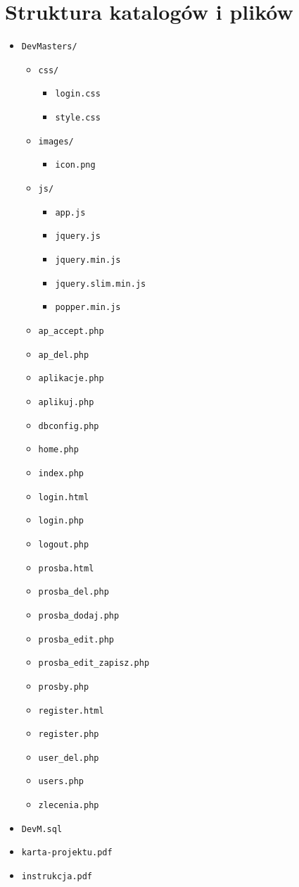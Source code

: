 \documentclass[a4paper,12pt]{article}
\begin{document}
\section{Struktura katalogów i plików}
\begin{itemize}
  \item \texttt{DevMasters/}
  \begin{itemize}
  \item \texttt{css/}
  \begin{itemize}
      \item \texttt{login.css}
      \item \texttt{style.css}
    \end{itemize}
    \item \texttt{images/}
    \begin{itemize}
      \item \texttt{icon.png}
    \end{itemize}
    \item \texttt{js/}
    \begin{itemize}
      \item \texttt{app.js}
      \item \texttt{jquery.js}
      \item \texttt{jquery.min.js}
      \item \texttt{jquery.slim.min.js}
      \item \texttt{popper.min.js}
    \end{itemize}
    \item \texttt{ap\_accept.php}
    \item \texttt{ap\_del.php}
    \item \texttt{aplikacje.php}
    \item \texttt{aplikuj.php}
    \item \texttt{dbconfig.php}
    \item \texttt{home.php}
    \item \texttt{index.php}
    \item \texttt{login.html}
    \item \texttt{login.php}
    \item \texttt{logout.php}
    \item \texttt{prosba.html}
    \item \texttt{prosba\_del.php}
    \item \texttt{prosba\_dodaj.php}
    \item \texttt{prosba\_edit.php}
    \item \texttt{prosba\_edit\_zapisz.php}
    \item \texttt{prosby.php}
    \item \texttt{register.html}
    \item \texttt{register.php}
    \item \texttt{user\_del.php}
    \item \texttt{users.php}
    \item \texttt{zlecenia.php}
  \end{itemize}
  \item \texttt{DevM.sql}
  \item \texttt{karta-projektu.pdf}
  \item \texttt{instrukcja.pdf}
\end{itemize}
\end{document}
